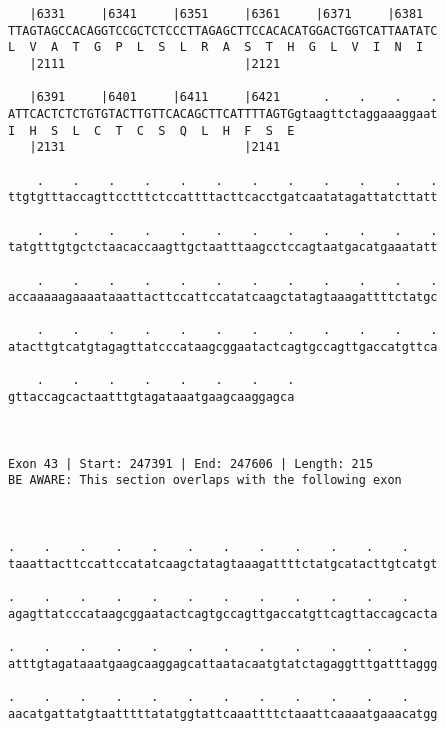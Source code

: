 \documentclass{article}
\begin{document}
\begin{Verbatim}
   |6331     |6341     |6351     |6361     |6371     |6381  
TTAGTAGCCACAGGTCCGCTCTCCCTTAGAGCTTCCACACATGGACTGGTCATTAATATC
L  V  A  T  G  P  L  S  L  R  A  S  T  H  G  L  V  I  N  I  
   |2111                         |2121                      
  
   |6391     |6401     |6411     |6421      .    .    .    .
ATTCACTCTCTGTGTACTTGTTCACAGCTTCATTTTAGTGgtaagttctaggaaaggaat
I  H  S  L  C  T  C  S  Q  L  H  F  S  E                    
   |2131                         |2141                      
  
    .    .    .    .    .    .    .    .    .    .    .    .
ttgtgtttaccagttcctttctccattttacttcacctgatcaatatagattatcttatt
                                                            
    .    .    .    .    .    .    .    .    .    .    .    .
tatgtttgtgctctaacaccaagttgctaatttaagcctccagtaatgacatgaaatatt
                                                            
    .    .    .    .    .    .    .    .    .    .    .    .
accaaaaagaaaataaattacttccattccatatcaagctatagtaaagattttctatgc
                                                            
    .    .    .    .    .    .    .    .    .    .    .    .
atacttgtcatgtagagttatcccataagcggaatactcagtgccagttgaccatgttca
                                                            
    .    .    .    .    .    .    .    .
gttaccagcactaatttgtagataaatgaagcaaggagca
                                        
                                        
 
Exon 43 | Start: 247391 | End: 247606 | Length: 215
BE AWARE: This section overlaps with the following exon



.    .    .    .    .    .    .    .    .    .    .    .    
taaattacttccattccatatcaagctatagtaaagattttctatgcatacttgtcatgt
                                                            
.    .    .    .    .    .    .    .    .    .    .    .    
agagttatcccataagcggaatactcagtgccagttgaccatgttcagttaccagcacta
                                                            
.    .    .    .    .    .    .    .    .    .    .    .    
atttgtagataaatgaagcaaggagcattaatacaatgtatctagaggtttgatttaggg
                                                            
.    .    .    .    .    .    .    .    .    .    .    .    
aacatgattatgtaatttttatatggtattcaaattttctaaattcaaaatgaaacatgg
                                                            

\end{Verbatim}
\end{document}
